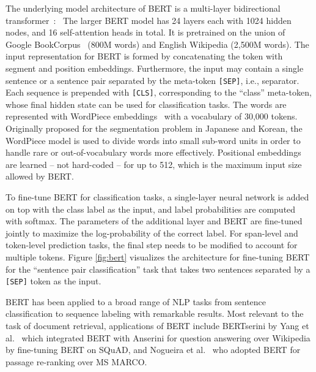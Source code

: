 The underlying model architecture of BERT is a multi-layer bidirectional transformer~\cite{vaswani2017attention}:\
The larger BERT model has 24 layers each with 1024 hidden nodes, and 16 self-attention heads in total.
It is pretrained on the union of Google BookCorpus~\cite{zhu2015aligning} (800M words) and English Wikipedia (2,500M words).
The input representation for BERT is formed by concatenating the token with segment and position embeddings.
Furthermore, the input may contain a single sentence or a sentence pair separated by the meta-token \texttt{[SEP]}, i.e., separator.
Each sequence is prepended with \texttt{[CLS]}, corresponding to the ``class'' meta-token, whose final hidden state can be used for classification tasks.
The words are represented with WordPiece embeddings~\cite{wu2016google} with a vocabulary of 30,000 tokens.
Originally proposed for the segmentation problem in Japanese and Korean, the WordPiece model is used to divide words into small sub-word units in order to handle rare or out-of-vocabulary words more effectively.
Positional embeddings are learned -- not hard-coded -- for up to 512, which is the maximum input size allowed by BERT.

To fine-tune BERT for classification tasks, a single-layer neural network is added on top with the class label as the input, and label probabilities are computed with softmax.
The parameters of the additional layer and BERT are fine-tuned jointly to maximize the log-probability of the correct label.
For span-level and token-level prediction tasks, the final step needs to be modified to account for multiple tokens.
Figure \ref{fig:bert} visualizes the architecture for fine-tuning BERT for the ``sentence pair classification'' task that takes two sentences separated by a \texttt{[SEP]} token as the input.

BERT has been applied to a broad range of NLP tasks from sentence classification to sequence labeling with remarkable results.
Most relevant to the task of document retrieval, applications of BERT include BERTserini by Yang et al.~\cite{yang2019end} which integrated BERT with Anserini for question answering over Wikipedia by fine-tuning BERT on SQuAD, and Nogueira et al.~\cite{nogueira2019passage} who adopted BERT for passage re-ranking over MS MARCO.

